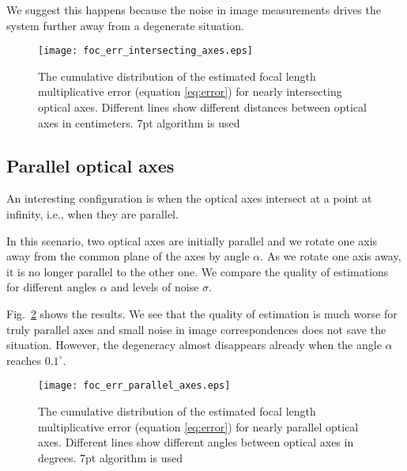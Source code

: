 We suggest this happens because the  noise in image measurements drives the system further away from a degenerate situation. %


\begin{figure}[h!]
  \begin{center}
    \texttt{[image: foc\_err\_intersecting\_axes.eps]}
    \caption[Focal length error for intersecting optical axes]{The cumulative distribution of the estimated focal length multiplicative error (equation \ref{eq:error}) for nearly intersecting optical axes. Different lines show different distances between optical axes in centimeters. 7pt algorithm is used}
    \label{interax}
  \end{center}
\end{figure}

\subsection{Parallel optical axes}
An interesting configuration is when the optical axes intersect at a point at infinity, i.e., when they are parallel.

In this scenario, two optical axes are initially parallel and we rotate one axis away from the common plane of the axes by  angle $\alpha$. As we rotate one axis away, it is no longer parallel to the other one. We compare the quality of estimations for different angles $\alpha$ and levels of noise $\sigma$.

Fig.~\ref{parallax} shows the results. We see that the quality of estimation is much worse for  truly parallel axes and small noise in image correspondences does not save the situation. However, the degeneracy almost disappears already when the angle $\alpha$ reaches $0.1^\circ$.


\begin{figure}[h!]
  \begin{center}
    \texttt{[image: foc\_err\_parallel\_axes.eps]}
    \caption[Focal length error for parallel optical axes]{The cumulative distribution of the estimated focal length multiplicative error (equation \ref{eq:error}) for nearly parallel optical axes. Different lines show different angles between optical axes in degrees. 7pt algorithm is used}
    \label{parallax}
  \end{center}
\end{figure}

